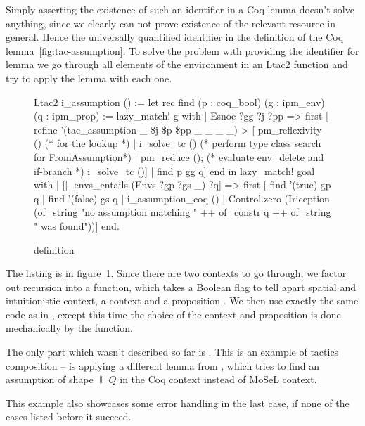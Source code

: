Simply asserting the existence of such an identifier in a Coq lemma doesn't solve anything, since we clearly can not prove existence of the relevant resource in general.
Hence the universally quantified identifier in the definition of the Coq lemma~\ref{fig:tac-assumption}.
To solve the problem with providing the identifier for lemma we go through all elements of the environment in an Ltac2 function and try to apply the lemma with each one.

\begin{figure}
\begin{coq}
Ltac2 i_assumption () :=
  let rec find (p : coq_bool) (g : ipm_env) (q : ipm_prop) :=
      lazy_match! g with
      | Esnoc ?gg ?j ?pp =>
        first [ refine '(tac_assumption _ \$j \$p \$pp _ _ _ _) >
                [ pm_reflexivity () (* for the lookup *)
                | i_solve_tc () (* perform type class search for FromAssumption*)
                | pm_reduce (); (* evaluate env_delete and if-branch *)
                  i_solve_tc ()]
              | find p gg q]
      end
  in
  lazy_match! goal with
  | [|- envs_entails (Envs ?gp ?gs _) ?q] =>
     first [ find '(true) gp q
           | find '(false) gs q
           | i_assumption_coq ()
           | Control.zero (Iriception (of_string "no assumption matching " ++
                                       of_constr q ++
                                       of_string " was found"))]
  end.
\end{coq}
\caption{ definition}
\label{fig:i-assumption-def}
\end{figure}

The listing is in figure~\ref{fig:i-assumption-def}.
Since there are two contexts to go through, we factor out recursion into a  function, which takes a Boolean flag  to tell apart spatial and intuitionistic context, a context  and a proposition .
We then use exactly the same code as in , except this time the choice of the context and proposition is done mechanically by the  function.

The only part which wasn't described so far is .
This is an example of tactics composition --  is applying a different lemma from , which tries to find an assumption of shape \(\Vdash Q\) in the Coq context instead of MoSeL context.

This example also showcases some error handling in the last case, if none of the cases listed before it succeed.

